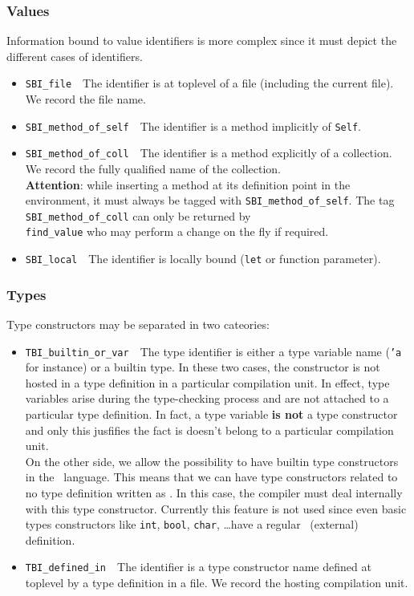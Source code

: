 \subsubsection{Values}
Information bound to value identifiers is more complex since it must
depict the different cases of identifiers.
\begin{itemize}
\item{\tt SBI\_file}\ \ The identifier is at toplevel of
  a file (including the current file). We record the file name.
  
\item {\tt SBI\_method\_of\_self}\ \ The identifier is a method
  implicitly of {\tt Self}.

\item {\tt SBI\_method\_of\_coll}\ \ The identifier is a method
  explicitly of a collection. We record the fully qualified name of
  the collection.\\
  {\bf Attention}: while inserting a method at its definition point in
  the environment, it must always be tagged with
  {\tt SBI\_method\_of\_self}. The tag {\tt SBI\_method\_of\_coll} can
  only be returned by \\
  {\tt find\_value} who may perform a change on the fly if required.

\item {\tt SBI\_local}\ \ The identifier is locally bound ({\tt let}
  or function parameter).
\end{itemize}

\subsubsection{Types}
Type constructors may be separated in two cateories:
\begin{itemize}
\item {\tt TBI\_builtin\_or\_var}\ \ The type identifier is either a
  type variable name ({\tt 'a} for instance) or a builtin type. In
  these two cases, the constructor is not hosted in a type definition
  in a particular compilation unit. In effect, type variables arise
  during the type-checking process and are not attached to a
  particular type definition. In fact, a type variable {\bf is not} a
  type constructor and only this jusfifies the fact is doesn't belong
  to a particular compilation unit. \\
  On the other side, we allow the possibility to have builtin type
  constructors in the \focalize\ language. This means that we can have
  type constructors related to no type definition written as
  \focalize. In this case, the compiler must deal internally with this
  type constructor. Currently this feature is not used since even
  basic types constructors like {\tt int}, {\tt bool}, {\tt char},
  \ldots have a regular \focalize\ (external) definition.

\item {\tt TBI\_defined\_in}\ \ The identifier is a type constructor
  name defined at toplevel by a type definition in a file. We record
  the hosting compilation unit.
\end{itemize}

